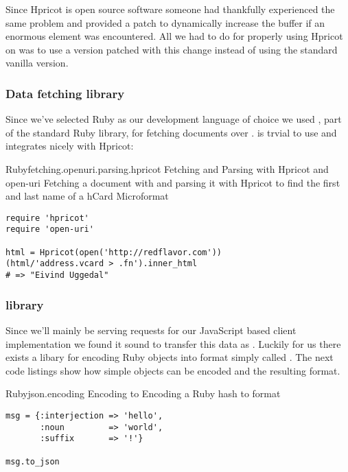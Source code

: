 Since Hpricot is open source software someone had thankfully experienced
the same problem and provided a patch to dynamically increase the
buffer if an enormous  element was encountered. All we had to do
for properly using Hpricot on \urort{} was to use a version patched with this
change instead of using the standard vanilla version.

\subsubsection{Data fetching library}

Since we've selected Ruby as our development language of choice we used
, part of the standard Ruby library, for fetching
documents over .
 is trvial to use and integrates nicely with Hpricot:

\begin{scode}{Ruby}{fetching.openuri.parsing.hpricot}{%
  Fetching and Parsing with Hpricot and open-uri}{%
  Fetching a  document with 
  and parsing it with Hpricot to find the first and
  last name of a hCard Microformat}
\begin{lstlisting}
require 'hpricot'
require 'open-uri'

html = Hpricot(open('http://redflavor.com'))
(html/'address.vcard > .fn').inner_html
# => "Eivind Uggedal"
\end{lstlisting}
\end{scode}

\subsubsection{ library}

Since we'll mainly be serving requests
for our JavaScript based client implementation we found it sound to transfer
this data as .%
Luckily for us there exists a libary for encoding
Ruby objects into  format
simply called .%
The next code listings show how simple objects can be encoded and the
resulting  format.

\begin{scode}{Ruby}{json.encoding}{%
  Encoding to }{%
  Encoding a Ruby hash to  format}
\begin{lstlisting}
msg = {:interjection => 'hello',
       :noun         => 'world',
       :suffix       => '!'}

msg.to_json
\end{lstlisting}
\end{scode}

